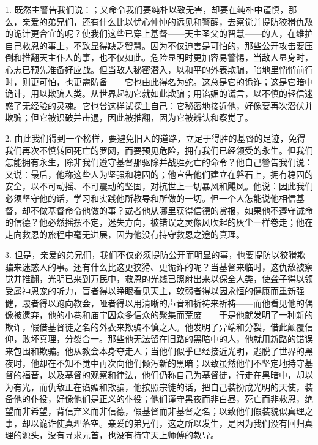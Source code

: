 1. 既然主警告我们说：；又命令我们要纯朴以致无害，却要在纯朴中谨慎，那么，亲爱的弟兄们，还有什么比以忧心忡忡的远见和警醒，去察觉并提防狡猾仇敌的诡计更合宜的呢？使我们这些已穿上基督——天主圣父的智慧——的人，在维护自己救恩的事上，不致显得缺乏智慧。因为不仅迫害是可怕的，那些公开攻击要压倒和推翻天主仆人的事，也不仅如此。危险显明时更加容易警惕，当敌人显身时，心志已预先准备好应战。但当敌人秘密潜入，以和平的外表欺骗，暗地里悄悄前行时，则更可怕，也更需防备——它也由此得名为蛇。这总是它的诡诈；这是它暗中诡计，用以欺骗人类。从世界起初它就如此欺骗；用谄媚的谎言，以不慎的轻信迷惑了无经验的灵魂。它也曾这样试探主自己：它秘密地接近他，好像要再次潜伏并欺骗；但它被识破并击退，因此被推翻，因为它被辨认和察觉了。\par

2. 由此我们得到一个榜样，要避免旧人的道路，立足于得胜的基督的足迹，免得我们再次不慎转回死亡的罗网，而要预见危险，拥有我们已经领受的永生。但我们怎能拥有永生，除非我们遵守基督那驱除并战胜死亡的命令？他自己警告我们说：又说：最后，他称这些人为坚强和稳固的；他宣告他们建立在磐石上，拥有稳固的安全，以不可动摇、不可震动的坚固，对抗世上一切暴风和飓风。他说：因此我们必须坚守他的话，学习和实践他所教导和所做的一切。但一个人怎能说他相信基督，却不做基督命令他做的事？或者他从哪里获得信德的赏报，如果他不遵守诫命的信德？他必然摇摆不定，迷失方向，被错误之灵像风吹起的灰尘一样卷走；他在走向救恩的旅程中毫无进展，因为他没有持守救恩之途的真理。\par

3. 但是，亲爱的弟兄们，我们不仅必须提防公开而明显的事，也要提防以狡猾欺骗来迷惑人的事。还有什么比这更狡猾、更诡诈的呢？当基督来临时，这仇敌被察觉并推翻，光明已来到万民中，救恩的光线已照射出来以保全人类，使聋子得以领受属神恩宠的听力，盲者得以睁眼看见天主，软弱者得以因永恒的健康而重新强健，跛者得以跑向教会，哑者得以用清晰的声音和祈祷来祈祷——而他看见他的偶像被遗弃，他的小巷和庙宇因众多信众的聚集而荒废——于是他就发明了一种新的欺诈，假借基督徒之名的外衣来欺骗不慎之人。他发明了异端和分裂，借此颠覆信仰，败坏真理，分裂合一。那些他无法留在旧路的黑暗中的人，他就用新路的错误来包围和欺骗。他从教会本身夺走人；当他们似乎已经接近光明，逃脱了世界的黑夜时，他却在不知不觉中再次向他们倾泻新的黑暗；以致虽然他们不坚定地持守基督的福音，以及基督的观察和律法，他们仍称自己为基督徒，行走在黑暗中，却以为有光，而仇敌正在谄媚和欺骗，他按照宗徒的话，把自己装扮成光明的天使，装备他的仆役，好像他们是正义的仆役；他们谨守黑夜而非白昼，死亡而非救恩，绝望而非希望，背信弃义而非信德，假基督而非基督之名；以致他们假装貌似真理之事，却以诡诈使真理落空。亲爱的弟兄们，这之所以发生，是因为我们没有回归真理的源头，没有寻求元首，也没有持守天上师傅的教导。\par


